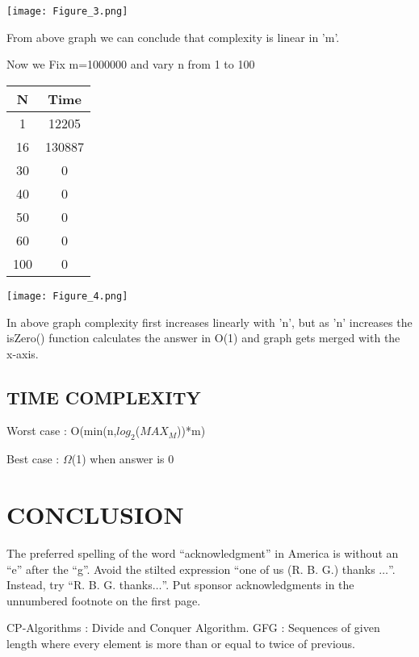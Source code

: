 \documentclass[conference]{IEEEtran}
\begin{document}
\texttt{[image: Figure\_3.png]}

From above graph we can conclude that complexity is linear in 'm'.

Now we Fix m=1000000 and vary n from 1 to 100

\begin{center}
   \begin{tabular}{|c|c|}
   \hline
   N & Time \\
   \hline\hline
    1 & 12205 \\
    \hline
    16 & 130887 \\
    \hline
    30 & 0 \\
    \hline
    40 & 0 \\
    \hline
    50 & 0 \\
    \hline
    60 & 0 \\
    \hline
    100 & 0 \\
    \hline
    \end{tabular} 
\end{center}

\texttt{[image: Figure\_4.png]}

In above graph complexity first increases linearly with 'n', but as 'n' increases the isZero() function calculates the answer in O(1) and graph gets merged with the x-axis. 

\subsection{TIME COMPLEXITY}

Worst case : O(min(n,$log_2$($MAX_M$))*m)

Best case  : $\Omega$(1) when answer is 0

\section*{CONCLUSION}

The preferred spelling of the word ``acknowledgment'' in America is without 
an ``e'' after the ``g''. Avoid the stilted expression ``one of us (R. B. 
G.) thanks $\ldots$''. Instead, try ``R. B. G. thanks$\ldots$''. Put sponsor 
acknowledgments in the unnumbered footnote on the first page.

\begin{thebibliography}{00}
 CP-Algorithms : Divide and Conquer Algorithm.
 GFG : Sequences of given length where every element is more than or equal to twice of previous.
\end{thebibliography}
\end{document}
